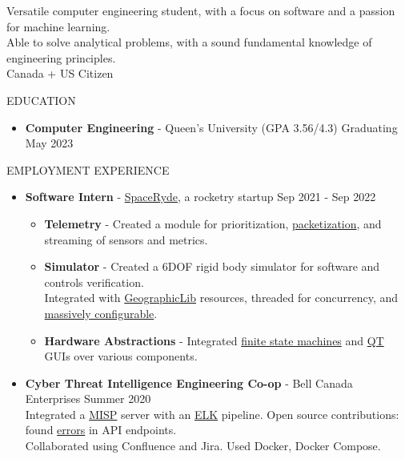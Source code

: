 \documentclass{resume} %
\begin{document}
Versatile computer engineering student, with a focus on software and a passion for machine learning.\\
Able to solve analytical problems, with a sound fundamental knowledge of engineering principles.\\
Canada + US Citizen

\begin{rSection}{EDUCATION}
\begin{itemize}
    \item {\bf Computer Engineering} - Queen's University (GPA 3.56/4.3) \hfill {Graduating May 2023}
\end{itemize}
\end{rSection}

\begin{rSection}{EMPLOYMENT EXPERIENCE}
\begin{itemize}
    \item {\bf Software Intern} - \href{https://youtu.be/-21FYbKWdd0}{SpaceRyde}, a rocketry startup \hfill {Sep 2021 - Sep 2022}
    \begin{itemize}
        \setlength\itemsep{-0.5em}
        \item[\textbullet] {\bf Telemetry} - Created a module for prioritization, \href{http://libtins.github.io/}{packetization}, and streaming of sensors and metrics.
        \item[\textbullet] {\bf Simulator} - Created a 6DOF rigid body simulator for software and controls verification.\\
        Integrated with \href{https://geographiclib.sourceforge.io/C++/doc/index.html}{GeographicLib} resources, threaded for concurrency, and \href{https://github.com/jbeder/yaml-cpp}{massively configurable}.
        \item[\textbullet] {\bf Hardware Abstractions} - Integrated \href{https://en.wikipedia.org/wiki/Finite-state_machine}{finite state machines} and \href{https://wiki.qt.io/Qt_for_Beginners}{QT} GUIs over various components. 
    \end{itemize}
    \item {\bf Cyber Threat Intelligence Engineering Co-op} - Bell Canada Enterprises \hfill {Summer 2020}\\
    Integrated a \href{https://www.misp-project.org/}{MISP} server with an \href{https://www.elastic.co/what-is/elk-stack}{ELK} pipeline. Open source contributions: found \href{https://github.com/MISP/PyMISP/issues/588}{errors} in API endpoints.\\
    Collaborated using Confluence and Jira. Used Docker, Docker Compose.
\end{itemize}
\end{rSection}
\end{document}

